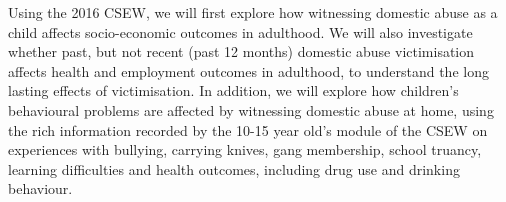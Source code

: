 \documentclass[11pt, a4paper]{article}
\newcommand{\TM}[1] {{\textcolor{orange}{#1}}}
\newcommand{\AT}[1] {{\textcolor{blue}{#1}}}
\begin{document}
%
%

Using the 2016 CSEW, we will first explore how witnessing domestic abuse as a child affects socio-economic outcomes in adulthood. We will also investigate whether past, but not recent (past 12 months) domestic abuse victimisation affects health and employment outcomes in adulthood, to understand the long lasting effects of victimisation.  In addition, we will explore how children's behavioural problems are affected by witnessing domestic abuse at home, using the rich information recorded by the 10-15 year old's module of the CSEW on experiences with bullying, carrying knives, gang membership, school truancy, learning difficulties and health outcomes, including drug use and drinking behaviour. 
 
 
\end{document}
